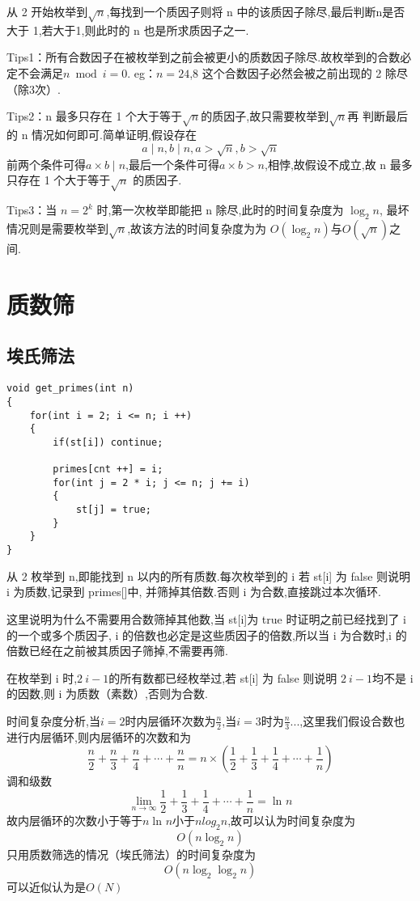 \documentclass[]{book}
\begin{document}
从 2 开始枚举到$\sqrt{n}$,每找到一个质因子则将 n 中的该质因子除尽,最后判断n是否
大于 1,若大于1,则此时的 n 也是所求质因子之一.

Tips1：所有合数因子在被枚举到之前会被更小的质数因子除尽.故枚举到的合数必定不会满足$n \bmod i = 0$.
eg：$n = 24$,8 这个合数因子必然会被之前出现的 2 除尽（除3次）.

Tips2：n 最多只存在 1 个大于等于$\sqrt{n}$的质因子,故只需要枚举到$\sqrt{n}$再
判断最后的 n 情况如何即可.简单证明,假设存在
\[ a \mid n, b \mid n, a>\sqrt{n}, b>\sqrt{n}\]
前两个条件可得$a \times b \mid n$,最后一个条件可得$a \times b > n$,相悖,故假设不成立,故 n 最多只存在
1 个大于等于$ \sqrt{n}$ 的质因子.

Tips3：当 $n = 2^k$ 时,第一次枚举即能把 n 除尽,此时的时间复杂度为 $\log_{2}{n}$,
最坏情况则是需要枚举到$\sqrt{n}$,故该方法的时间复杂度为为 $O(\log_{2}{n})$与$O(\sqrt{n})$之间.
\section{质数筛}
\subsection{埃氏筛法}
\begin{lstlisting}
void get_primes(int n)
{
    for(int i = 2; i <= n; i ++)
    {
        if(st[i]) continue;
        
        primes[cnt ++] = i;
        for(int j = 2 * i; j <= n; j += i)
        {
            st[j] = true;
        }
    }
}
\end{lstlisting}

从 2 枚举到 n,即能找到 n 以内的所有质数.每次枚举到的 i 若 st[i] 为 false 则说明 i 为质数,记录到 primes[]中,
并筛掉其倍数.否则 i 为合数,直接跳过本次循环.

这里说明为什么不需要用合数筛掉其他数,当 st[i]为 true 时证明之前已经找到了 i 的一个或多个质因子,
i 的倍数也必定是这些质因子的倍数,所以当 i 为合数时,i 的倍数已经在之前被其质因子筛掉,不需要再筛.

在枚举到 i 时,$2 ~ i-1$的所有数都已经枚举过,若 st[i] 为 false 则说明 $2 ~ i-1$均不是 i 的因数,则 i 为质数（素数）,否则为合数.

时间复杂度分析,当$i=2$时内层循环次数为$\frac{n}{2}$,当$i=3$时为$\frac{n}{3}$...,这里我们假设合数也进行内层循环,则内层循环的次数和为
\[\frac{n}{2} + \frac{n}{3} + \frac{n}{4} + \cdots + \frac{n}{n} = n \times (\frac{1}{2} + \frac{1}{3} + \frac{1}{4} + \cdots + \frac{1}{n})\]
调和级数
\[\lim_{n \to \infty} \frac{1}{2} + \frac{1}{3} + \frac{1}{4} + \cdots + \frac{1}{n} = \ln_{}{n}\]
故内层循环的次数小于等于$n\ln_{}{n}$小于$nlog_{2}{n}$,故可以认为时间复杂度为
\[O(n\log_{2}{n})\]
只用质数筛选的情况（埃氏筛法）的时间复杂度为
\[O(n\log_{2}{\log_{2}{n}})\]
可以近似认为是$O(N)$
\end{document}
